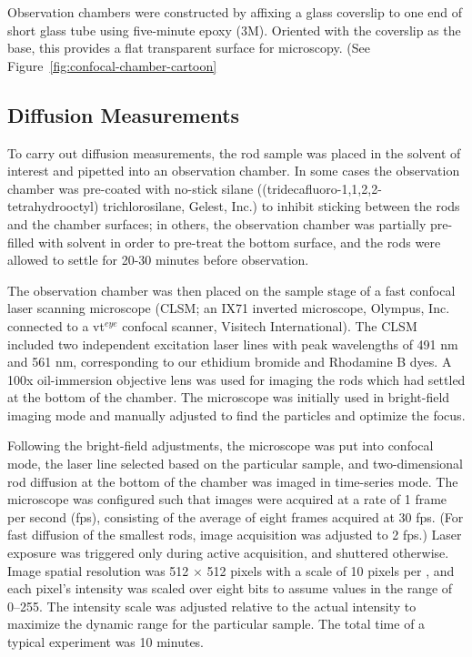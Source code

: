 

Observation chambers were constructed by affixing a glass coverslip to one end of short glass tube using 
five-minute epoxy (3M).  Oriented with the coverslip as the base, this provides a flat transparent surface
for microscopy. (See Figure~\ref{fig:confocal-chamber-cartoon}


\subsection{Diffusion Measurements}

To carry out diffusion measurements, the rod sample was placed in the solvent of interest and pipetted into an observation 
chamber.  In some cases the observation chamber was pre-coated with no-stick silane ((tridecafluoro-1,1,2,2-tetrahydrooctyl) 
trichlorosilane, Gelest, Inc.) to inhibit sticking between the rods and the chamber surfaces; in others,
the observation chamber was partially pre-filled with solvent in order to pre-treat the 
bottom surface, and the rods were allowed to settle for 20-30 minutes before observation.

The observation chamber was then placed on the sample stage of a fast confocal laser scanning microscope (CLSM; 
an IX71 inverted microscope, Olympus, Inc. connected to a vt$^{eye}$ confocal scanner, Visitech International). The CLSM
included two independent excitation laser lines with peak wavelengths of 491 nm and 561 nm, corresponding to our ethidium 
bromide and Rhodamine B dyes.  A 100x oil-immersion objective lens was used for imaging the rods which had settled at the bottom
of the chamber.  The microscope was initially used in bright-field imaging mode and manually adjusted to find the particles and 
optimize the focus.

Following the bright-field adjustments, the microscope was put into confocal mode, the laser line selected 
based on the particular sample, and two-dimensional rod diffusion at the 
bottom of the chamber was imaged in time-series mode.  The microscope was configured such that images were acquired at
a rate of 1 frame per second (fps), consisting of the average of eight frames acquired at 30 fps.  
(For fast diffusion of the smallest rods,
image acquisition was adjusted to 2 fps.)  Laser exposure was triggered only during active 
acquisition, and shuttered otherwise.  Image spatial resolution was 512 $\times$ 512 pixels with a scale of 10 pixels
per \microns, and each pixel's intensity was scaled over eight bits to assume values in the range of 0--255.
The intensity scale was adjusted relative to the actual intensity to maximize the dynamic range for the particular sample.
The total time of a typical experiment was 10 minutes.

